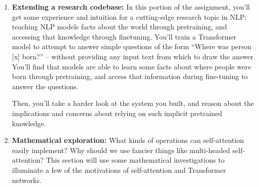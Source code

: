 \begin{enumerate}
\item \textbf{Extending a research codebase:}
In this portion of the assignment, you'll get some experience and intuition for a cutting-edge research topic in NLP: teaching NLP models facts about the world through pretraining, and accessing that knowledge through finetuning.
You'll train a Transformer model to attempt to answer simple questions of the form ``Where was person [x] born?'' -- without providing any input text from which to draw the answer.
You'll find that models are able to learn some facts about where people were born through pretraining, and access that information during fine-tuning to answer the questions.

Then, you'll take a harder look at the system you built, and reason about the implications and concerns about relying on such implicit pretrained knowledge.

\item \textbf{Mathematical exploration:}  What kinds of operations can self-attention easily implement? Why should we use fancier things like multi-headed self-attention?
This section will use some mathematical investigations to illuminate a few of the motivations of self-attention and Transformer networks.



\end{enumerate}

